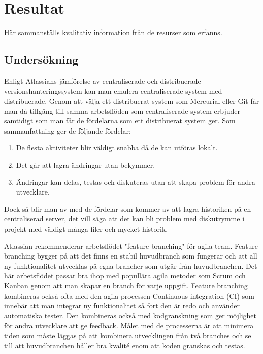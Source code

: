 \section{Resultat}
\label{sec:bjorn-results}
Här sammanställs kvalitativ information från de resurser som erfanns.


\subsection{Undersökning}
Enligt Atlassians jämförelse av centraliserade och distribuerade versionshanteringssystem kan man emulera centraliserade system med distribuerade. Genom att välja ett distribuerat system som Mercurial eller Git får man då tillgång till samma arbetsflöden som centraliserade system erbjuder samtidigt som man får de fördelarna som ett distribuerat system ger. Som sammanfattning ger de följande fördelar:
\begin{enumerate}
\item De flesta aktiviteter blir väldigt snabba då de kan utföras lokalt.
\item Det går att lagra ändringar utan bekymmer.
\item Ändringar kan delas, testas och diskuteras utan att skapa problem för andra utvecklare.
\end{enumerate}
Dock så blir man av med de fördelar som kommer av att lagra historiken på en centraliserad server, det vill säga att det kan bli problem med diskutrymme i projekt med väldigt många filer och mycket historik.\cite{central-vs-distributed}

Atlassian rekommenderar arbetsflödet "feature branching" för agila team. Feature branching bygger på att det finns en stabil huvudbranch som fungerar och att all ny funktionalitet utvecklas på egna brancher som utgår från huvudbranchen. Det här arbetsflödet passar bra ihop med popullära agila metoder som Scrum och Kanban genom att man skapar en branch för varje uppgift. Feature branching kombineras också ofta med den agila processen Continuous integration (CI) som innebär att man integrar ny funktionalitet så fort den är redo och använder automatiska tester. Den kombineras också med kodgranskning som ger möjlighet för andra utvecklare att ge feedback. Målet med de processerna är att minimera tiden som måste läggas på att kombinera utvecklingen från två branches och se till att huvudbranchen håller bra kvalité enom att koden granskas och testas.\cite{daly-agile-git, radigan-feature-branch, atlassian-feature-branch}

